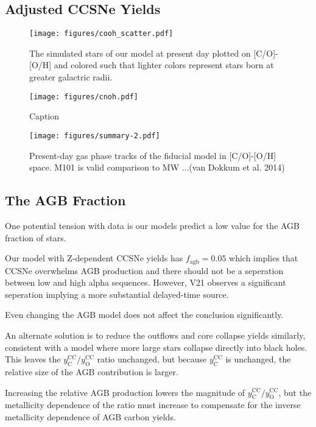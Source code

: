 \documentclass[fleqn,usenatbib]{mnras}
\begin{document}
\subsection{Adjusted CCSNe Yields}

\begin{figure}
    \texttt{[image: figures/cooh\_scatter.pdf]}
    \caption{The simulated stars of our model at present day plotted on [C/O]-[O/H] and colored such that lighter colors represent stars born at greater galactric radii.}
\end{figure}

\begin{figure}
    \centering
    \texttt{[image: figures/cnoh.pdf]}
    \caption{Caption}
    \label{fig:cnofe}
\end{figure}


\begin{figure*}
\centering
\texttt{[image: figures/summary-2.pdf]}
\caption{Present-day gas phase tracks of the fiducial model in [C/O]-[O/H] space. M101 is valid comparison to MW ...(van Dokkum et al. 2014)}
\label{fig:gas_phase}
\end{figure*}
\subsection{The AGB Fraction }
One potential tension with data is our models predict a low value for the AGB fraction of stars. 

Our model with Z-dependent CCSNe yields has $f_\text{agb} = 0.05$ which implies that CCSNe overwhelms AGB production and there should not be a seperation between low and high alpha sequences. However, V21 observes a significant seperation implying a more substantial delayed-time source. 

Even changing the AGB model does not affect the conclusion significantly. 

An alternate solution is to reduce the outflows and core collapse yields similarly, consistent with a model where more large stars collapse directly into black holes. This leaves the $y_\text{C}^\text{CC}/y_\text{O}^\text{CC}$ ratio unchanged, but because $y_\text{C}^\text{CC}$ is unchanged, the relative size of the AGB contribution is larger. 


Increasing the relative AGB production lowers the magnitude of  $y_\text{C}^\text{CC}/y_\text{O}^\text{CC}$, but the metallicity dependence of the ratio must increase to compensate for the inverse metallicity dependence of AGB carbon yields. 
\end{document}
